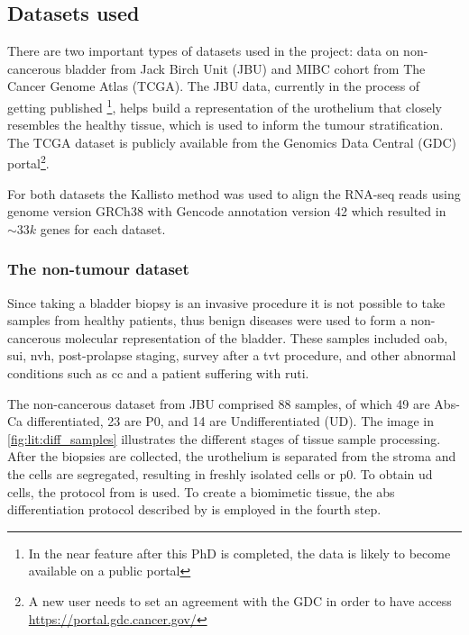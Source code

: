 \subsection{Datasets used} \label{s:lit:datasets_used}

There are two important types of datasets used in the project: data on non-cancerous bladder from Jack Birch Unit (JBU) and MIBC cohort from The Cancer Genome Atlas (TCGA). The JBU data, currently in the process of getting published \footnote{In the near feature after this PhD is completed, the data is likely to become available on a public portal}, helps build a representation of the urothelium that closely resembles the healthy tissue, which is used to inform the tumour stratification. The TCGA dataset is publicly available from the Genomics Data Central (GDC) portal\footnote{A new user needs to set an agreement with the GDC in order to have access \url{https://portal.gdc.cancer.gov/}}.


For both datasets the Kallisto method was used to align the RNA-seq reads using genome version GRCh38 with Gencode annotation version 42 which resulted in $\sim33k$ genes for each dataset.



\subsubsection*{The non-tumour dataset} \label{s:lit:non_tum_data}

Since taking a bladder biopsy is an invasive procedure it is not possible to take samples from healthy patients, thus benign diseases were used to form a non-cancerous molecular representation of the bladder. These samples included \acrfull{oab}, \acrfull{sui}, \acrfull{nvh}, post-prolapse staging, survey after a \acrfull{tvt} procedure, and other abnormal conditions such as \acrfull{cc} and a patient suffering with \acrfull{ruti}.

The non-cancerous dataset from JBU comprised 88 samples, of which 49 are Abs-Ca differentiated, 23 are P0, and 14 are Undifferentiated (UD). The image in \cref{fig:lit:diff_samples} illustrates the different stages of tissue sample processing. After the biopsies are collected, the urothelium is separated from the stroma and the cells are segregated, resulting in freshly isolated cells or \acrshort{p0}. To obtain \acrfull{ud} cells, the protocol from \citet{Cross2005-fe} is used. To create a biomimetic tissue, the \acrshort{abs} differentiation protocol described by \citet{Cross2005-fe} is employed in the fourth step.

